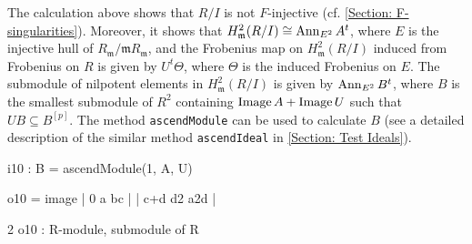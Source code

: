 \documentclass{amsart}
\begin{document}
\begin{example}
The calculation above shows that $R/I$ is not $F$-injective (cf. \autoref{Section: F-singularities}).
Moreover, it shows that $H^2_{\mathfrak{m}} (R/I)\cong \operatorname{{Ann}}_{E^2} A^t$,
where $E$ is the injective hull of $R_{\mathfrak{m}}/ {\mathfrak{m}} R_{\mathfrak{m}}$,
and the Frobenius map on  $H^2_{\mathfrak{m}} (R/I)$ induced from Frobenius on $R$
is given by $U^t \Theta$, where $\Theta$ is the induced Frobenius on $E$.
The submodule of nilpotent elements in  $H^2_{\mathfrak{m}} (R/I)$ is
given by $\operatorname{{Ann}}_{E^2} B^t$, where $B$ is the smallest submodule of $R^2$ containing $\operatorname{Image} A + \operatorname{Image} U$ such that $U  B \subseteq B^{[p]}$.
The method \texttt{ascendModule} can be used to calculate  $B$ (see a detailed description of the similar method \texttt{ascendIdeal} in \autoref{Section: Test Ideals}).

\medskip
{\small{}
\begin{MyVerbatim}
i10 : B = ascendModule(1, A, U)

o10 = image | 0   a  bc  |
            | c+d d2 a2d |

                              2
o10 : R-module, submodule of R
\end{MyVerbatim}
}\medskip


\end{example}





\end{document}
